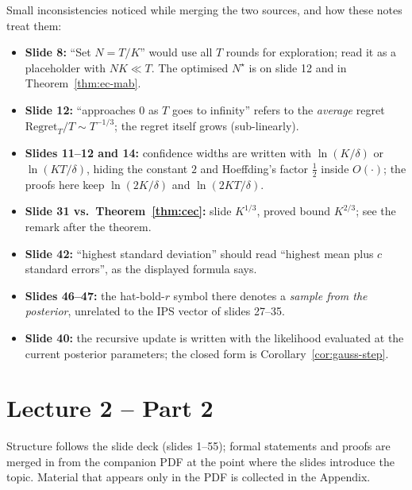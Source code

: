 \documentclass[11pt,a4paper]{article}
\newcommand{\Reg}{\mathrm{Regret}}
\theoremstyle{plain}
\theoremstyle{definition}
\theoremstyle{remark}
\begin{document}
Small inconsistencies noticed while merging the two sources, and how these notes treat them:
\begin{itemize}
 \item \textbf{Slide 8:} ``Set $N=T/K$'' would use all $T$ rounds for exploration; read it as a placeholder with $NK\ll T$. The optimised $N^\star$ is on slide 12 and in Theorem~\ref{thm:ec-mab}.
 \item \textbf{Slide 12:} ``approaches 0 as $T$ goes to infinity'' refers to the \emph{average} regret $\Reg_T/T\sim T^{-1/3}$; the regret itself grows (sub-linearly).
 \item \textbf{Slides 11--12 and 14:} confidence widths are written with $\ln(K/\delta)$ or $\ln(KT/\delta)$, hiding the constant $2$ and Hoeffding's factor $\tfrac12$ inside $O(\cdot)$; the proofs here keep $\ln(2K/\delta)$ and $\ln(2KT/\delta)$.
 \item \textbf{Slide 31 vs.\ Theorem~\ref{thm:cec}:} slide $K^{1/3}$, proved bound $K^{2/3}$; see the remark after the theorem.
 \item \textbf{Slide 42:} ``highest standard deviation'' should read ``highest mean plus $c$ standard errors'', as the displayed formula says.
 \item \textbf{Slides 46--47:} the hat-bold-$r$ symbol there denotes a \emph{sample from the posterior}, unrelated to the IPS vector of slides 27--35.
 \item \textbf{Slide 40:} the recursive update is written with the likelihood evaluated at the current posterior parameters; the closed form is Corollary~\ref{cor:gauss-step}.
\end{itemize}

\newpage

\setcounter{section}{0}
\renewcommand{\thesection}{\arabic{section}}
\part{Lecture 2 -- Part 2}

\begin{center}\small
Structure follows the slide deck (slides 1--55); formal statements and proofs are merged in from the
companion PDF at the point where the slides introduce the topic. Material that appears only in the PDF is
collected in the Appendix.
\end{center}
\end{document}
